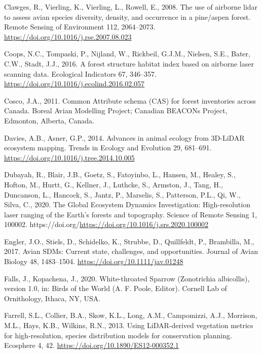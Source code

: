 \documentclass[
]{article}
\newlength{\cslhangindent}
\newlength{\cslentryspacingunit} %
\newenvironment{CSLReferences}[2] %
 {%
  \setlength{\parindent}{0pt}
  \ifodd #1
  \let\oldpar\par
  \def\par{\hangindent=\cslhangindent\oldpar}
  \fi
  \setlength{\parskip}{#2\cslentryspacingunit}
 }%
 {}
\begin{document}
\begin{CSLReferences}{1}{0}
\leavevmode{}%
Clawges, R., Vierling, K., Vierling, L., Rowell, E., 2008. The use of airborne lidar to assess avian species diversity, density, and occurrence in a pine/aspen forest. Remote Sensing of Environment 112, 2064--2073. \url{https://doi.org/10.1016/j.rse.2007.08.023}

\leavevmode{}%
Coops, N.C., Tompaski, P., Nijland, W., Rickbeil, G.J.M., Nielsen, S.E., Bater, C.W., Stadt, J.J., 2016. A forest structure habitat index based on airborne laser scanning data. Ecological Indicators 67, 346--357. \url{https://doi.org/10.1016/j.ecolind.2016.02.057}

\leavevmode{}%
Cosco, J.A., 2011. Common {Attribute} schema ({CAS}) for forest inventories across {Canada}. Boreal Avian Modelling Project; Canadian BEACONs Project, Edmonton, Alberta, Canada.

\leavevmode{}%
Davies, A.B., Asner, G.P., 2014. Advances in animal ecology from {3D}-{LiDAR} ecosystem mapping. Trends in Ecology and Evolution 29, 681--691. \url{https://doi.org/10.1016/j.tree.2014.10.005}

\leavevmode{}%
Dubayah, R., Blair, J.B., Goetz, S., Fatoyinbo, L., Hansen, M., Healey, S., Hofton, M., Hurtt, G., Kellner, J., Luthcke, S., Armston, J., Tang, H., Duncanson, L., Hancock, S., Jantz, P., Marselis, S., Patterson, P.L., Qi, W., Silva, C., 2020. The {Global} {Ecosystem} {Dynamics} {Investigation}: {High}-resolution laser ranging of the {Earth}'s forests and topography. Science of Remote Sensing 1, 100002. https://doi.org/\url{https://doi.org/10.1016/j.srs.2020.100002}

\leavevmode{}%
Engler, J.O., Stiels, D., Schidelko, K., Strubbe, D., Quillfeldt, P., Brambilla, M., 2017. Avian {SDMs}: Current state, challenges, and opportunities. Journal of Avian Biology 48, 1483--1504. \url{https://doi.org/10.1111/jav.01248}

\leavevmode{}%
Falls, J., Kopachena, J., 2020. White-throated {Sparrow} ({Zonotrichia} albicollis), version 1.0, in: Birds of the {World} ({A}. {F}. {Poole}, {Editor}). Cornell Lab of Ornithology, Ithaca, NY, USA.

\leavevmode{}%
Farrell, S.L., Collier, B.A., Skow, K.L., Long, A.M., Campomizzi, A.J., Morrison, M.L., Hays, K.B., Wilkins, R.N., 2013. Using {LiDAR}-derived vegetation metrics for high-resolution, species distribution models for conservation planning. Ecosphere 4, 42. \url{https://doi.org/10.1890/ES12-000352.1}


\end{CSLReferences}
\end{document}
